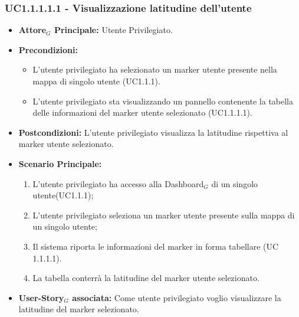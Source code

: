 \documentclass[11pt]{article}
\begin{document}
\begin{justify}
\subsubsection{\textbf{UC1.1.1.1.1 - Visualizzazione latitudine dell'utente}}
\label{UC1.1.1.1.1}
\begin{itemize}
     \item \textbf{Attore$_G$ Principale:} Utente Privilegiato.
     \item \textbf{Precondizioni:}
        \begin{itemize}
          \item L'utente privilegiato ha selezionato un marker utente presente nella mappa di singolo utente (UC1.1.1).
          \item L'utente privilegiato sta visualizzando un pannello contenente la tabella delle informazioni del marker utente selezionato (UC1.1.1.1).
        \end{itemize}
      \item \textbf{Postcondizioni:} L'utente privilegiato visualizza la latitudine rispettiva al marker utente selezionato. 
      \item \textbf{Scenario Principale:}
        \begin{enumerate}
            \item L'utente privilegiato ha accesso alla Dashboard$_G$ di un singolo utente(UC1.1.1);
            \item L'utente privilegiato seleziona un marker utente presente sulla mappa di un singolo utente;
            \item Il sistema riporta le informazioni del marker in forma tabellare (UC 1.1.1.1).
            \item La tabella conterrà la latitudine del marker utente selezionato.
        \end{enumerate}
     \item \textbf{User-Story$_G$ associata:}
       Come utente privilegiato voglio visualizzare la latitudine del marker selezionato.
\end{itemize}


\end{justify}
\end{document}
